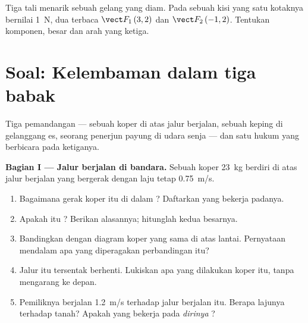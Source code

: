 \begin{exercise}[$\star\star\star$]\label{exo:g10:inertia:15}
Tiga tali menarik sebuah gelang yang diam. Pada sebuah kisi yang satu
kotaknya bernilai \qty{1}{N}, dua  terbaca $\vect F_1\,(3, 2)$
dan $\vect F_2\,(-1, 2)$. Tentukan komponen, besar dan arah  yang
ketiga.
\end{exercise}

\section{Soal: Kelembaman dalam tiga babak}

\begin{problem}
\label{pb:g10:inertia:1}
Tiga pemandangan --- sebuah koper di atas jalur berjalan, sebuah keping
di gelanggang es, seorang penerjun payung di udara senja --- dan satu
hukum yang berbicara pada ketiganya.

\medskip
\noindent\textbf{Bagian I --- Jalur berjalan di bandara.}
Sebuah koper \qty{23}{kg} berdiri di atas jalur berjalan yang bergerak
dengan laju tetap \qty{0.75}{m/s}.
\begin{enumerate}
  \item Bagaimana gerak koper itu di dalam ? Daftarkan
         yang bekerja padanya.
  \item Apakah  itu ? Berikan alasannya;
        hitunglah kedua besarnya.
  \item Bandingkan  dengan diagram koper yang sama di
        atas lantai. Pernyataan mendalam apa yang diperagakan
        perbandingan itu?
  \item Jalur itu tersentak berhenti. Lukiskan apa yang dilakukan koper
        itu, tanpa mengarang  ke depan.
  \item Pemiliknya berjalan \qty{1.2}{m/s} terhadap jalur berjalan itu.
        Berapa lajunya terhadap tanah? Apakah  yang bekerja pada
        \emph{dirinya} ?
\end{enumerate}


\end{problem}
